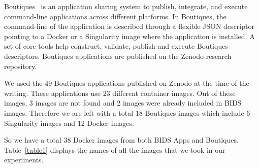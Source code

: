 \documentclass[a4paper,num-refs]{oup-contemporary}
\begin{document}
Boutiques~\cite{glatard2018boutiques} is an application sharing system to
publish, integrate, and execute command-line applications across different
platforms. In Boutiques, the command-line of the application is described
through a flexible JSON descriptor pointing to a Docker or a Singularity
image where the application is installed. A set of core tools help
construct, validate, publish and execute Boutiques descriptors. Boutiques
applications are published on the Zenodo research repository.

We used the 49 Boutiques applications published on Zenodo at the time of
the writing. These applications use 23 different container images. Out of these images,
3 images are not found and 2 images were already included in BIDS images.
Therefore we are left with a total 18 Boutiques images which include 6
Singularity images and 12 Docker images.

So we have a total 38 Docker images from both BIDS Apps and Boutiques.
	Table~\ref{table1} displays the names of all the images that we took in our experiments.
\end{document}
